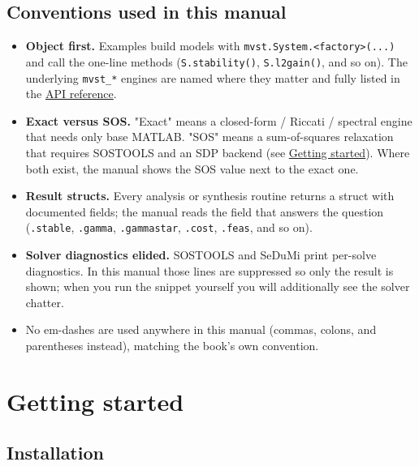 \documentclass[11pt,oneside]{report}
\newcommand{\code}[1]{\texttt{#1}}
\providecommand{\tightlist}{\setlength{\itemsep}{0pt}\setlength{\parskip}{0pt}}
\begin{document}
\hypertarget{conventions-used-in-this-manual}{%
\section*{Conventions used in this manual}\label{conventions-used-in-this-manual}}

\begin{itemize}
\tightlist
\item
  \textbf{Object first.} Examples build models with \code{mvst.System.\textless{}factory\textgreater{}(...)} and
  call the one-line methods (\code{S.stability()}, \code{S.l2gain()}, and so on). The
  underlying \code{mvst\_*} engines are named where they matter and fully listed in
  the \protect\hyperlink{chap:13-api-reference}{API reference}.
\item
  \textbf{Exact versus SOS.} "Exact" means a closed-form / Riccati / spectral engine
  that needs only base MATLAB. "SOS" means a sum-of-squares relaxation that
  requires SOSTOOLS and an SDP backend (see \protect\hyperlink{chap:01-getting-started}{Getting started}).
  Where both exist, the manual shows the SOS value next to the exact one.
\item
  \textbf{Result structs.} Every analysis or synthesis routine returns a struct with
  documented fields; the manual reads the field that answers the question
  (\code{.stable}, \code{.gamma}, \code{.gammastar}, \code{.cost}, \code{.feas}, and so on).
\item
  \textbf{Solver diagnostics elided.} SOSTOOLS and SeDuMi print per-solve
  diagnostics. In this manual those lines are suppressed so only the result is
  shown; when you run the snippet yourself you will additionally see the solver
  chatter.
\item
  No em-dashes are used anywhere in this manual (commas, colons, and
  parentheses instead), matching the book's own convention.
\end{itemize}


\hypertarget{chap:01-getting-started}{%
\chapter{Getting started}\label{chap:01-getting-started}}

\hypertarget{installation}{%
\section{Installation}\label{installation}}
\end{document}
